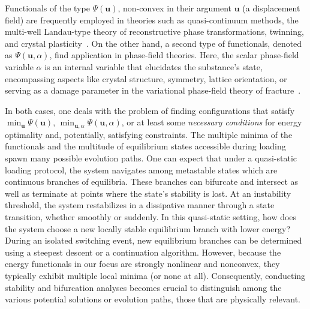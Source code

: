 Functionals of the type $\Psi(\mathbf u)$, non-convex in their argument  $\mathbf u$ (a displacement field) are frequently employed in theories such as quasi-continuum methods, the multi-well Landau-type theory of reconstructive phase transformations, twinning, and crystal plasticity~\cite{Tadmor1996-qi,Conti2004-yj,Clayton2011-xq,Baggio2019-rs,Baggio2023-qu}. On the other hand, a second type of functionals, denoted as $\Psi(\mathbf u, \alpha)$, find application in phase-field theories. Here, the scalar phase-field variable $\alpha$ is an internal variable that elucidates the substance's state, encompassing aspects like crystal structure, symmetry, lattice orientation, \cite{Finel2010-zw,Ruffini2015-pn,Javanbakht2016-dr} or serving as a damage parameter in the variational phase-field theory of fracture~\cite{francfort_marigo1998,Salman2021-mn}. 

In both cases, one deals with the problem of finding  configurations that satisfy $\min_{\boldsymbol{u}} \Psi(\boldsymbol{u})$, $\min_{\boldsymbol{u},\alpha} \Psi(\boldsymbol{u},\alpha)$, or at least some \emph{necessary conditions} for energy optimality and, potentially, satisfying constraints. 
The multiple minima of the functionals and the multitude of equilibrium states accessible during loading spawn many possible evolution paths. One can expect that under a quasi-static loading protocol, the system navigates among metastable states which are continuous branches of equilibria. These branches can bifurcate and intersect as well as terminate at points where the state’s stability is lost.
At an instability threshold, the system restabilizes in a dissipative manner through a state transition, whether smoothly or suddenly.
In this quasi-static setting, how does the system choose a new locally stable equilibrium branch with lower energy?
During an isolated switching event, new equilibrium branches can be determined using a steepest descent or a continuation algorithm. However, because the energy functionals in our focus are strongly nonlinear and nonconvex, they typically exhibit multiple local minima (or none at all). Consequently, conducting stability and bifurcation analyses becomes crucial to distinguish among the various potential solutions or evolution paths, those that are physically relevant.

